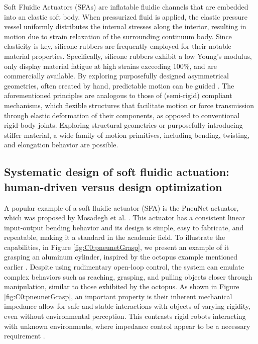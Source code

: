 Soft Fluidic Actuators (SFAs) are inflatable fluidic channels that are embedded into an elastic soft body. When pressurized fluid is applied, the elastic pressure vessel uniformly distributes the internal stresses along the interior, resulting in motion due to strain relaxation of the surrounding continuum body. Since elasticity is key, silicone rubbers are frequently employed for their notable material properties. Specifically, silicone rubbers exhibit a low Young's modulus, only display material fatigue at high strains exceeding $100\%$, and are commercially available. By exploring purposefully designed asymmetrical geometries, often created by hand, predictable motion can be guided \cite{Xavier2022Jun,Rus2015,Hughes2016Nov}. The aforementioned principles are analogous to those of (semi-rigid) compliant mechanisms, which flexible structures that facilitate motion or force transmission through elastic deformation of their components, as opposed to conventional rigid-body joints. Exploring structural geometries or purposefully introducing stiffer material, a wide family of motion primitives, including bending, twisting, and elongation behavior are possible. 

\subsection[Human-driven design versus design optimization]{Systematic design of soft fluidic actuation: human-driven versus design optimization}
A popular example of a soft fluidic actuator (SFA) is the PneuNet actuator, which was proposed by Mosadegh et al. \cite{Mosadegh2014}. This actuator has a consistent linear input-output bending behavior and its design is simple, easy to fabricate, and repeatable, making it a standard in the academic field. To illustrate the capabilities, in Figure \ref{fig:C0:pneunetGrasp}, we present an example of it grasping an aluminum cylinder, inspired by the octopus example mentioned earlier \cite{Sumbre2001Sep}. Despite using rudimentary open-loop control, the system can emulate complex behaviors such as reaching, grasping, and pulling objects closer through manipulation, similar to those exhibited by the octopus. As shown in Figure \ref{fig:C0:pneunetGrasp}, an important property is their inherent mechanical impedance allow for safe and stable interactions with objects of varying rigidity, even without environmental perception. This contrasts rigid robots interacting with unknown environments, where impedance control appear to be a necessary requirement \cite{Murray1994,DeLuca2016Jul}.

